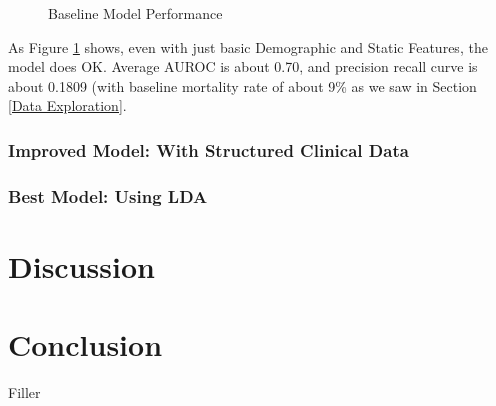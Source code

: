 \documentclass[12pt, final]{article}
\begin{document}
\begin{figure}[H]
\centering     %
{}
\caption{Baseline Model Performance}
\label{BaselineModelPerformance}
\end{figure}

As Figure \ref{BaselineModelPerformance} shows, even with just basic Demographic and Static Features, the model does OK. Average AUROC is about 0.70, and precision recall curve is about 0.1809 (with baseline mortality rate of about 9\% as we saw in Section \ref{Data Exploration}.

\subsubsection{Improved Model: With Structured Clinical Data}

\subsubsection{Best Model: Using LDA}

\section{Discussion}
\label{Discussion}

\section{Conclusion}
\label{Conclusion}
Filler
\end{document}
